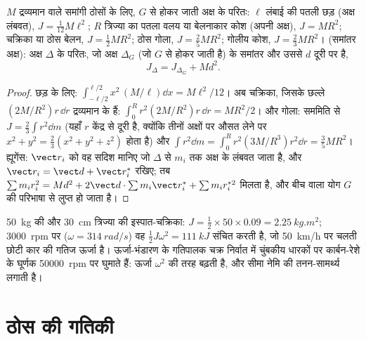 \begin{proposition}[जड़त्व आघूर्ण]\label{prop:b2:rigid-body-mechanics:inertia}
$M$ द्रव्यमान वाले समांगी ठोसों के लिए, $G$ से होकर जाती अक्ष के परितः:
$\ell$ लंबाई की पतली छड़ (अक्ष लंबवत), $J = \tfrac1{12}M\ell^2$; $R$ त्रिज्या
का पतला वलय या बेलनाकार कोश (अपनी अक्ष), $J = MR^2$; चक्रिका या ठोस
बेलन, $J = \tfrac12MR^2$; ठोस गोला, $J = \tfrac25MR^2$; गोलीय
कोश, $J = \tfrac23MR^2$। \emph{} (समांतर अक्ष): अक्ष
$\Delta$ के परितः, जो अक्ष $\Delta_G$ (जो $G$ से होकर जाती है) के समांतर
और उससे $d$ दूरी पर है,
\[
J_\Delta = J_{\Delta_G} + Md^2 .
\]
\end{proposition}

\begin{proof}
छड़ के लिए: $\int_{-\ell/2}^{\ell/2}x^2\,(M/\ell)\dd x = M\ell^2/12$।
अब चक्रिका, जिसके छल्ले $(2M/R^2)r\,\dd r$ द्रव्यमान के हैं:
$\int_0^R r^2(2M/R^2)r\,\dd r = MR^2/2$। और गोला: सममिति से
$J = \tfrac23\int r^2\dd m$ (यहाँ $r$ केंद्र से दूरी है,
क्योंकि तीनों अक्षों पर औसत लेने पर $x^2 + y^2 = \tfrac23(x^2 + y^2 + z^2)$ होता है)
और $\int r^2\dd m = \int_0^R r^2(3M/R^3)r^2\dd r = \tfrac35MR^2$।
ह्यूगेंस: $\vect r_i$ को वह सदिश मानिए जो $\Delta$ से $m_i$ तक अक्ष के
लंबवत जाता है, और $\vect r_i = \vect d + \vect r_i^*$ रखिए; तब $\sum m_ir_i^2 = Md^2
+ 2\vect d\cdot\sum m_i\vect r_i^* + \sum m_ir_i^{*2}$ मिलता है, और बीच वाला योग
$G$ की परिभाषा से लुप्त हो जाता है।
\end{proof}

\begin{example}[एक गतिपालक चक्र]\label{ex:b2:rigid-body-mechanics:flywheel}
\qty{50}{kg} की और \qty{30}{cm} त्रिज्या की इस्पात-चक्रिका: $J = \tfrac12 \times
50 \times 0.09 = \qty{2.25}{kg.m^2}$; \qty{3000}{rpm} पर ($\omega =
\qty{314}{rad/s}$) वह $\tfrac12J\omega^2 = \qty{111}{kJ}$ संचित करती है, जो
\qty{50}{km/h} पर चलती छोटी कार की गतिज ऊर्जा है। ऊर्जा-भंडारण के
गतिपालक चक्र निर्वात में चुंबकीय धारकों पर कार्बन-रेशे के घूर्णक
\qty{50000}{rpm} पर घुमाते हैं: ऊर्जा $\omega^2$ की तरह बढ़ती है, और सीमा
नेमि की तनन-सामर्थ्य लगाती है।
\end{example}

\section{ठोस की गतिकी}

